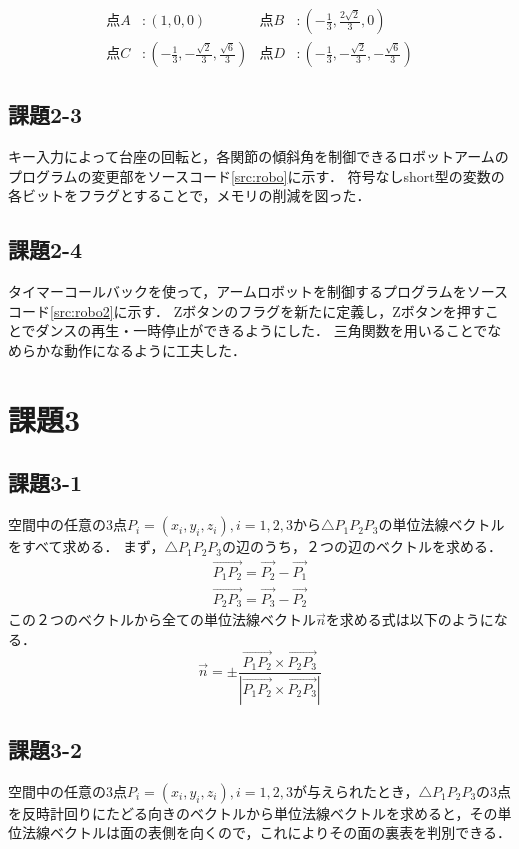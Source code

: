 \documentclass[twocolumn]{jsarticle}%
\begin{document}
\begin{align*}
点A&:\left(1, 0, 0\right)&点B&:\left(-\frac{1}{3}, \frac{2\sqrt{2}}{3}, 0\right)\\
点C&:\left(-\frac{1}{3}, -\frac{\sqrt{2}}{3}, \frac{\sqrt{6}}{3}\right)&点D&:\left(-\frac{1}{3}, -\frac{\sqrt{2}}{3}, -\frac{\sqrt{6}}{3}\right)
\end{align*}

\subsection{課題2-3}
キー入力によって台座の回転と，各関節の傾斜角を制御できるロボットアームのプログラムの変更部をソースコード\ref{src:robo}に示す．
符号なしshort型の変数の各ビットをフラグとすることで，メモリの削減を図った．


\subsection{課題2-4}
タイマーコールバックを使って，アームロボットを制御するプログラムをソースコード\ref{src:robo2}に示す．
Zボタンのフラグを新たに定義し，Zボタンを押すことでダンスの再生・一時停止ができるようにした．
三角関数を用いることでなめらかな動作になるように工夫した．

\section{課題3}
\subsection{課題3-1}
空間中の任意の3点$P_i = (x_i, y_i, z_i), i=1,2,3$から$\triangle{P_1P_2P_3}$の単位法線ベクトルをすべて求める．
まず，$\triangle{P_1P_2P_3}$の辺のうち，２つの辺のベクトルを求める．
\begin{eqnarray}
\overrightarrow{P_1P_2} = \vec{P_2} - \vec{P_1}\nonumber\\
\overrightarrow{P_2P_3} = \vec{P_3} - \vec{P_2}\nonumber
\end{eqnarray}
この２つのベクトルから全ての単位法線ベクトル$\vec{n}$を求める式は以下のようになる．
\begin{equation}
\vec{n}=\pm\frac{\overrightarrow{P_1P_2} \times \overrightarrow{P_2P_3}}{|\overrightarrow{P_1P_2} \times \overrightarrow{P_2P_3}|}\nonumber
\end{equation}

\subsection{課題3-2}
空間中の任意の3点$P_i = (x_i, y_i, z_i), i=1,2,3$が与えられたとき，$\triangle{P_1P_2P_3}$の3点を反時計回りにたどる向きのベクトルから単位法線ベクトルを求めると，その単位法線ベクトルは面の表側を向くので，これによりその面の裏表を判別できる．
\end{document}

